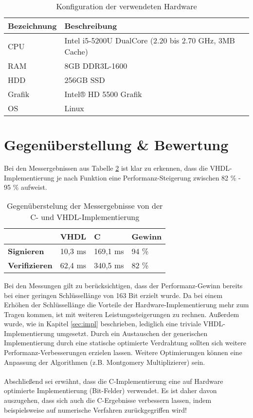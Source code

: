 \begin{table}
	\centering 
	\begin{tabular}{ | l | l | }
		\hline
		Bezeichnung & Beschreibung \\
		\hline
		CPU & Intel i5-5200U DualCore (2.20 bis 2.70 GHz, 3MB Cache) \\ 
		RAM & 8GB DDR3L-1600 \\
		HDD & 256GB SSD  \\
		Grafik & Intel® HD 5500 Grafik \\
		OS & Linux \\
		\hline
	\end{tabular}
	\caption{Konfiguration der verwendeten Hardware}
	\label{c-impl-hardware}
\end{table}


\section{Gegenüberstellung \& Bewertung}
\label{sec:messung-results}

Bei den Messergebnissen aus Tabelle \ref{messung-results} ist klar zu erkennen, dass die VHDL-Implementierung je nach Funktion eine Performanz-Steigerung zwischen 82 \% - 95 \% aufweist. \\

\begin{table} [h]
	\centering 
	\begin{tabular}{ | p{3cm} | p{2cm} | p{2cm} | p{2cm} | }
		\hline
		 & \textbf{VHDL} & \textbf{C} & \textbf{Gewinn} \\
		\hline
		\textbf{Signieren} & 10,3 ms & 169,1 ms & 94 \% \\
		\hline
		\textbf{Verifizieren} &  62,4 ms & 340,5 ms & 82 \% \\
		\hline
	\end{tabular}
	\caption{Gegenüberstelung der Messergebnisse von der C- und VHDL-Implementierung}
	\label{messung-results}
\end{table}

Bei den Messungen gilt zu berücksichtigen, dass der Performanz-Gewinn bereits bei einer geringen Schlüssellänge von 163 Bit erzielt wurde. Da bei einem Erhöhen der Schlüssellänge die Vorteile der Hardware-Implementierung mehr zum Tragen kommen, ist mit weiteren Leistungssteigerungen zu rechnen. Außerdem wurde, wie in Kapitel \ref{sec:impl} beschrieben, lediglich eine triviale VHDL-Implementierung umgesetzt. Durch ein Austauschen der generischen Implementierung durch eine statische optimierte Verdrahtung sollten sich weitere Performanz-Verbesserungen erzielen lassen. Weitere Optimierungen können eine Anpassung der Algorithmen (z.B. Montgomery Multiplizierer) sein.
\\ \\
Abschließend sei erwähnt, dass die C-Implementierung \cite{kewish} eine auf Hardware optimierte Implementierung (Bit-Felder) verwendet. Es ist daher davon auszugehen, dass sich auch die C-Ergebnisse verbessern lassen, indem beispielsweise auf numerische Verfahren zurückgegriffen wird!  


